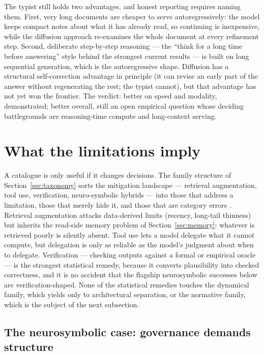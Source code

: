 \documentclass[11pt,a4paper]{article}
\begin{document}
The typist still holds two advantages, and honest reporting requires naming
them. First, very long documents are cheaper to serve autoregressively: the
model keeps compact notes about what it has already read, so continuing is
inexpensive, while the diffusion approach re-examines the whole document at
every refinement step. Second, deliberate step-by-step reasoning --- the
``think for a long time before answering'' style behind the strongest
current results --- is built on long sequential generation, which is the
autoregressive shape. Diffusion has a structural self-correction advantage
in principle (it can revise an early part of the answer without regenerating
the rest; the typist cannot), but that advantage has not yet won the
frontier. The verdict: better on speed and modality, demonstrated; better
overall, still an open empirical question whose deciding battlegrounds are
reasoning-time compute and long-context serving.

\section{What the limitations imply}
\label{sec:implications}

A catalogue is only useful if it changes decisions. The family structure of
Section~\ref{sec:taxonomy} sorts the mitigation landscape --- retrieval
augmentation, tool use, verification, neuro-symbolic hybrids --- into those
that address a limitation, those that merely hide it, and those that are
category errors \autocite{gao2023rag}. Retrieval augmentation attacks
data-derived limits (recency, long-tail thinness) but inherits the read-side
memory problem of Section~\ref{sec:memory}: whatever is retrieved poorly is
silently absent. Tool use lets a model delegate what it cannot compute, but
delegation is only as reliable as the model's judgment about when to
delegate. Verification --- checking outputs against a formal or empirical
oracle --- is the strongest statistical remedy, because it converts
plausibility into checked correctness, and it is no accident that the
flagship neurosymbolic successes below are verification-shaped. None of the
statistical remedies touches the dynamical family, which yields only to
architectural separation, or the normative family, which is the subject of
the next subsection.

\subsection{The neurosymbolic case: governance demands structure}
\label{sec:neurosymbolic}
\end{document}
